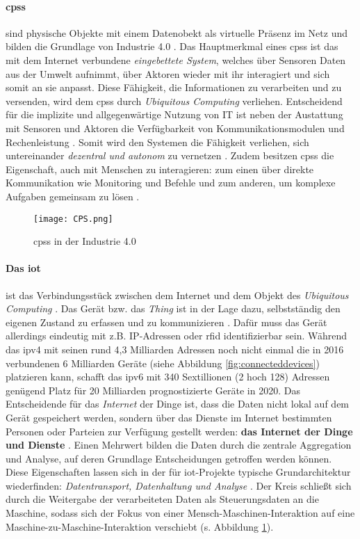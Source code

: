 \paragraph{\acf{cpss}}
sind physische Objekte mit einem Datenobekt als virtuelle Präsenz im Netz und bilden die Grundlage von Industrie 4.0 \citep{Drath2016}. Das Hauptmerkmal eines \ac{cpss} ist das mit dem Internet verbundene \textit{eingebettete System}, welches über Sensoren Daten aus der Umwelt aufnimmt, über Aktoren wieder mit ihr interagiert und sich somit an sie anpasst. Diese Fähigkeit, die Informationen zu verarbeiten und zu versenden, wird dem \ac{cpss} durch \textit{Ubiquitous Computing} verliehen. Entscheidend für die implizite und allgegenwärtige Nutzung von IT  ist neben der Austattung mit Sensoren und Aktoren die Verfügbarkeit von Kommunikationsmodulen und Rechenleistung \citep{Roth2016}. Somit wird den Systemen die Fähigkeit verliehen, sich untereinander \textit{dezentral und autonom} zu vernetzen \citep{Bauernhansl2014}. Zudem besitzen \ac{cpss} die Eigenschaft, auch mit Menschen zu interagieren: zum einen über direkte Kommunikation wie Monitoring und Befehle und zum anderen, um komplexe Aufgaben gemeinsam zu lösen \citep{Lueth2016}.


\begin{figure}[ht]
  \centering
  \texttt{[image: CPS.png]}
  \caption[CPS in der Industrie 4.0]{\ac{cpss} in der Industrie 4.0 \citep[S. 30]{Roth2016}}
  \label{fig:cpskreis}
\end{figure}

\paragraph{Das \acf{iot}} ist das Verbindungsstück zwischen dem Internet und dem Objekt des \textit{Ubiquitous Computing} \citep{Roth2016}. Das Gerät bzw. das \textit{Thing} ist in der Lage dazu, selbstständig den eigenen Zustand zu erfassen und zu kommunizieren \citep{Kenn2016}. Dafür muss das Gerät allerdings eindeutig mit z.B. IP-Adressen oder \ac{rfid} identifizierbar sein. Während das \acf{ipv4} mit seinen rund 4,3 Milliarden Adressen noch nicht einmal die in 2016 verbundenen 6 Milliarden Geräte (siehe Abbildung \ref{fig:connecteddevices}) platzieren kann, schafft das \ac{ipv6} mit 340 Sextillionen (2 hoch 128) Adressen genügend Platz für 20 Milliarden prognostizierte Geräte in 2020. Das Entscheidende für das \textit{Internet} der Dinge ist, dass die Daten nicht lokal auf dem Gerät gespeichert werden, sondern über das Dienste im Internet bestimmten Personen oder Parteien zur Verfügung gestellt werden: \textbf{das Internet der Dinge und Dienste} \citep{Hanisch2017}. Einen Mehrwert bilden die Daten durch die zentrale Aggregation und Analyse, auf deren Grundlage Entscheidungen getroffen werden können. Diese Eigenschaften lassen sich in der für \ac{iot}-Projekte typische Grundarchitektur wiederfinden: \textit{Datentransport, Datenhaltung und Analyse} \citep{Kenn2016}. Der Kreis schließt sich durch die Weitergabe der verarbeiteten Daten als Steuerungsdaten an die Maschine, sodass sich der Fokus von einer Mensch-Maschinen-Interaktion auf eine Maschine-zu-Maschine-Interaktion verschiebt  (s. Abbildung \ref{fig:cpskreis}).

